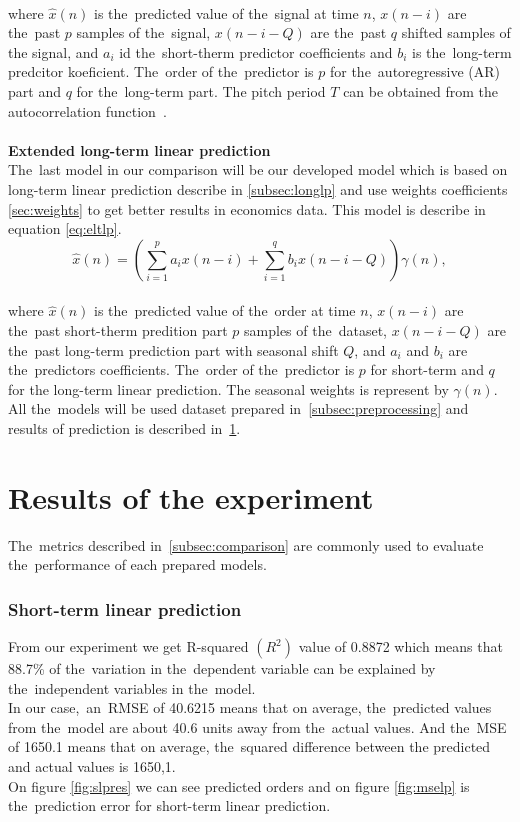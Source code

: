 \\
where $\hat{x}(n)$ is the~predicted value of the~signal at time $n$, $x(n-i)$ are the~past $p$ samples of the~signal,
$x(n-i-Q)$ are the~past $q$ shifted samples of the signal, and $a_i$ id the~short-therm predictor coefficients and $b_i$ is
the~long-term predcitor koeficient. The~order of the~predictor is $p$ for the~autoregressive (AR) part
and $q$ for the~long-term part. The pitch period $T$ can be obtained from the autocorrelation
function~\cite{vaseghi2008advanced}.\\
\\
\textbf{Extended long-term linear prediction}\\
The~last model in our comparison will be our developed model which is based on long-term linear prediction
describe in \ref{subsec:longlp} and use weights coefficients \ref{sec:weights} to get better results in
economics data. This model is describe in equation \ref{eq:eltlp}.
    \begin{equation}
        \hat{x}(n) = \left(\sum_{i=1}^{p} a_i x(n-i) + \sum_{i=1}^{q} b_i x(n-i-Q)\right) \gamma(n),
    \end{equation}
    \\
    where $\hat{x}(n)$ is the~predicted value of the~order at time $n$, $x(n-i)$ are the~past short-therm
    predition part $p$ samples of the~dataset, $x(n-i-Q)$ are the~past long-term prediction part with seasonal
    shift $Q$, and $a_i$ and $b_i$ are the~predictors coefficients. The~order of the~predictor is $p$ for
    short-term and $q$ for the long-term linear prediction. The seasonal weights is represent by $\gamma(n)$.\\
All the~models will be used dataset prepared in~\ref{subsec:preprocessing} and results of prediction is
described in~\ref{subsec:experimentResults}.

\section{Results of the experiment}\label{subsec:experimentResults}
    The~metrics described in~\ref{subsec:comparison} are commonly used to evaluate
     the~performance of each prepared models.
    
     \subsubsection{Short-term linear prediction} \label{subsec:res_slp}
    From our experiment we get R-squared $(R^2)$ value of 0.8872 which means that
    88.7\% of the~variation in the~dependent variable can be explained
    by the~independent variables in the~model.\\
    In our case,~an~RMSE of 40.6215 means that on average, the~predicted values
    from the~model are about 40.6 units away from the~actual values.
    And the~MSE of 1650.1 means that on average, the~squared difference between the
    predicted and actual values is 1650,1.\\
    On figure \ref{fig:slpres} we can see predicted orders and on figure \ref{fig:mselp}
    is the~prediction error for short-term linear prediction.
    
